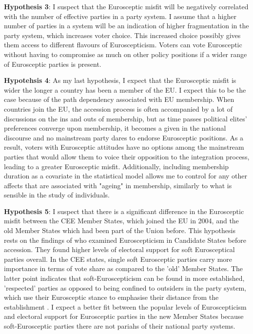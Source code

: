 \textbf{Hypothesis 3}: I suspect that the Eurosceptic misfit will be negatively correlated with the number of effective parties in a party system. I assume that a higher number of parties in a system will be an indication of higher fragmentation in the party system, which increases voter choice. This increased choice possibly gives them access to different flavours of Euroscepticism. Voters can vote Eurosceptic without having to compromise as much on other policy positions if a wider range of Eurosceptic parties is present.

\textbf{Hypotehsis 4}: As my last hypothesis, I expect that the Eurosceptic misfit is wider the longer a country has been a member of the EU. I expect this to be the case because of the path dependency associated with EU membership. When countries join the EU, the accession process is often accompanied by a lot of discussions on the ins and outs of membership, but as time passes political elites' preferences converge upon membership, it becomes a given in the national discourse and no mainstream party dares to endorse Eurosceptic positions. As a result, voters with Eurosceptic attitudes have no options among the mainstream parties that would allow them to voice their opposition to the integration process, leading to a greater Eurosceptic misfit. Additionally, including membership duration as a covariate in the statistical model allows me to control for any other affects that are associated with "ageing" in membership, similarly to what is sensible in the study of individuals.

\textbf{Hypothesis 5}: I suspect that there is a significant difference in the Eurosceptic misfit between the CEE Member States, which joined the EU in 2004, and the old Member States which had been part of the Union before. This hypothesis rests on the findings of  who examined Euroscepticism in Candidate States before accession. They found higher levels of electoral support for soft Eurosceptical parties overall. In the CEE states, single soft Eurosceptic parties carry more importance in terms of vote share as compared to the 'old' Member States. The latter point indicates that soft-Euroscepticism can be found in more established, 'respected' parties as opposed to being confined to outsiders in the party system, which use their Eurosceptic stance to emphasise their distance from the establishment \cite{Mair2000}. I expect a better fit between the popular levels of Euroscepticism and electoral support for Eurosceptic parties in the new Member States because soft-Eurosceptic parties there are not pariahs of their national party systems.



